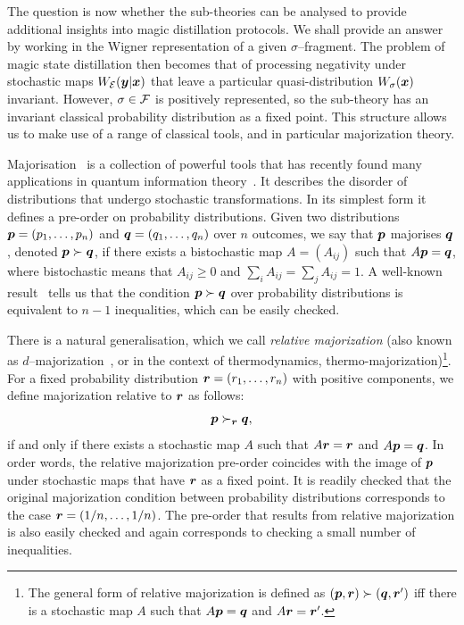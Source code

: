 \documentclass[pra,
aps,
twocolumn,
superscriptaddress,
groupedaddress,
nofootinbib,
reprint
]{revtex4-1}
\begin{document}
The question is now whether the sub-theories can be analysed to provide additional insights into magic distillation protocols. We shall provide an answer by working in the Wigner representation of a given $\sigma$--fragment. The problem of magic state distillation then becomes that of processing negativity under stochastic maps $W_{\mathcal{E}}( \boldsymbol{y} |\boldsymbol{x})$ that leave a particular quasi-distribution $W_\sigma(\boldsymbol{x})$ invariant. However, $\sigma \in \mathcal{F}$ is positively represented, so the sub-theory has an invariant classical probability distribution as a fixed point. This structure allows us to make use of a range of classical tools, and in particular majorization theory.

Majorisation~\cite{cit:marshall} is a collection of powerful tools that has recently found many applications in quantum information theory~\cite{Nielsen_1999, cit:cwiklinski, cit:lostaglio2, cit:gour, cit:gour2, Horodecki_2003, Vallejos_2021}.
It describes the disorder of distributions that undergo stochastic transformations. In its simplest form it defines a pre-order on probability distributions. Given two distributions $\boldsymbol{p}= (p_1, \dots, p_n)$ and $\boldsymbol{q} = (q_1, \dots, q_n)$ over $n$ outcomes, we say that $\boldsymbol{p}$ majorises $\boldsymbol{q}$, denoted $\boldsymbol{p} \succ \boldsymbol{q}$, if there exists a bistochastic map $A = (A_{ij})$ such that $A\boldsymbol{p} = \boldsymbol{q}$, where bistochastic means that $A_{ij} \geq 0$ and $\sum_i A_{ij} = \sum_j A_{ij} = 1$. A well-known result~\cite{cit:marshall} tells us that the condition $ \boldsymbol{p} \succ \boldsymbol{q}$ over probability distributions is equivalent to $n-1$ inequalities, which can be easily checked.

There is a natural generalisation, which we call \emph{relative majorization} (also known as $d$--majorization~\cite{Veinott_1971}, or in the context of thermodynamics, thermo-majorization)\footnote{The general form of relative majorization is defined as $(\boldsymbol{p},\boldsymbol{r}) \succ (\boldsymbol{q}, \boldsymbol{r}')$ iff there is a stochastic map $A$ such that $A\boldsymbol{p} = \boldsymbol{q}$ and $A\boldsymbol{r} = \boldsymbol{r}'$.}. For a fixed probability distribution $\boldsymbol{r} = (r_1, \dots, r_n)$ with positive components, we define majorization relative to $\boldsymbol{r}$ as follows:
\begin{equation}
\boldsymbol{p} \succ_{\boldsymbol{r}} \boldsymbol{q},
\end{equation}
if and only if there exists a stochastic map $A$ such that $A\boldsymbol{r} = \boldsymbol{r}$ and $A \boldsymbol{p} = \boldsymbol{q}$. In order words, the relative majorization pre-order coincides with the image of $\boldsymbol{p}$ under stochastic maps that have $\boldsymbol{r}$ as a fixed point. It is readily checked that the original majorization condition between probability distributions corresponds to the case $\boldsymbol{r} = (1/n, \dots, 1/n)$. The pre-order that results from relative majorization is also easily checked and again corresponds to checking a small number of inequalities.
\end{document}
